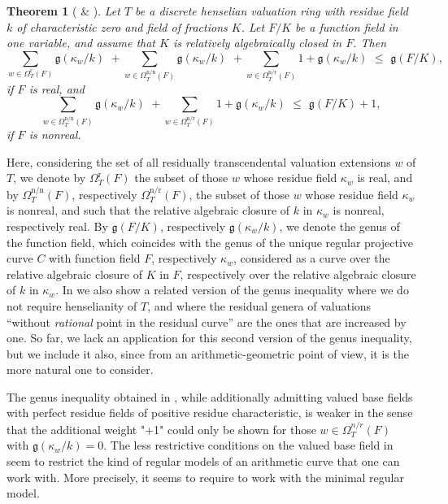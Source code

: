 \documentclass[a4paper,12pt,reqno]{amsart}
\newtheorem*{thm*}{Theorem}
\theoremstyle{definition}
\numberwithin{equation}{thm}
\renewcommand{\leq}{\leqslant}
\begin{document}
\begin{thm*}[ \& ] Let $T$ be a discrete henselian valuation ring with residue field $k$ of characteristic zero and field of fractions $K$. 
Let $F/K$ be a function field in one variable, and assume that $K$ is relatively algebraically closed in $F$. 
Then
$$\sum_{w \in \Omega^{\text{r}}_T(F)} \mathfrak{g}(\kappa_w/k) \,\, + \sum_{w \in \Omega^{\text{n}/\text{n}}_T(F)} \mathfrak{g}(\kappa_w/k) \,\, +  \sum_{w \in \Omega^{\text{n/r}}_T(F)} \!\!1+ \mathfrak{g}(\kappa_w/k) \,\, \leq \,\, \mathfrak{g}(F/K),$$
if $F$ is real, and 
$$\sum_{w \in \Omega^{\text{n}/\text{n}}_T(F)} \mathfrak{g}(\kappa_w/k) \,\,+ \sum_{w \in \Omega^{\text{n/r}}_T(F)} \!\!1+ \mathfrak{g}(\kappa_w/k) \,\, \leq \,\, \mathfrak{g}(F/K) + 1,$$
if $F$ is nonreal.
\end{thm*}
Here, considering the set of all residually transcendental valuation extensions $w$ of $T$, we denote by $\Omega^{\text{r}}_T(F)$ the subset of those $w$ whose residue field $\kappa_w$ is real, and by $\Omega^{\text{n/n}}_T(F)$, respectively $\Omega^{\text{n/r}}_T(F)$,  the subset of those $w$ whose residue field $\kappa_w$ is nonreal, and such that the relative algebraic closure of $k$ in $\kappa_w$ is nonreal, respectively real. By $\mathfrak{g}(F/K)$, respectively $\mathfrak{g}(\kappa_w/k)$, we denote the genus of the function field, which coincides with the genus of the unique regular projective curve $C$ with function field $F$, respectively $\kappa_w$, considered as a curve over the relative algebraic closure of $K$ in $F$, respectively over the relative algebraic closure of $k$ in $\kappa_w$.  In  we also show a related version of the genus inequality where we do not require henselianity of $T$, and where the residual genera of valuations  ``without \textit{rational} point in the residual curve'' are the ones that are increased by one. So far, we lack an application for this second version of the genus inequality, but we include it also, since from an arithmetic-geometric point of view, it is the more natural one to consider.

The genus inequality obtained in \cite{BG24}, while additionally admitting valued base fields with perfect residue fields of positive residue characteristic, 
is weaker in the sense that the additional weight "+1" could only be shown for those $w \in \Omega^{n/r}_T(F)$ with $\mathfrak{g}(\kappa_w/k)=0$.
The less restrictive conditions on the valued base field in \cite{BG24} seem to restrict the kind of regular models of an arithmetic curve that one can work with. More precisely, it seems to require to work with the minimal regular model.
\end{document}

